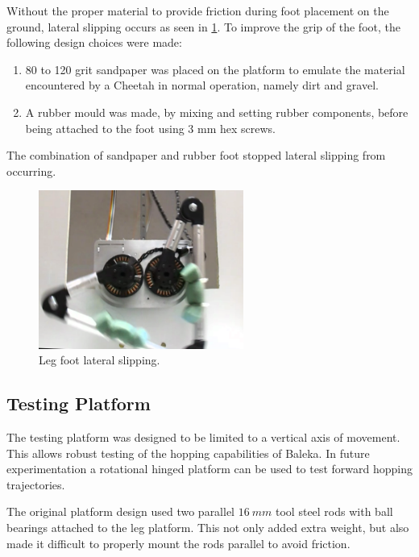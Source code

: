 Without the proper material to provide friction during foot placement on the ground, lateral slipping occurs as seen in \cref{fig:foot-slipping}. To improve the grip of the foot, the following design choices were made:

\begin{enumerate}
\item 80 to 120 grit sandpaper was placed on the platform to emulate the material encountered by a Cheetah in normal operation, namely dirt and gravel.
\item A rubber mould was made, by mixing and setting rubber components, before being attached to the foot using 3 mm hex screws.
\end{enumerate}

The combination of sandpaper and rubber foot stopped lateral slipping from occurring.

\begin{figure}
\centering
\includegraphics[width=0.6\textwidth]{images/experiments/lateral-slipping} 
\caption{Leg foot lateral slipping.}
\label{fig:foot-slipping}
\end{figure}

\subsection{Testing Platform}
\label{subsec:Testing Platform}

The testing platform was designed to be limited to a vertical axis of movement. This allows robust testing of the hopping capabilities of Baleka. In future experimentation a rotational hinged platform can be used to test forward hopping trajectories. 

The original platform design used two parallel $16\ mm$ tool steel rods with ball bearings attached to the leg platform. This not only added extra weight, but also made it difficult to properly mount the rods parallel to avoid friction. 

